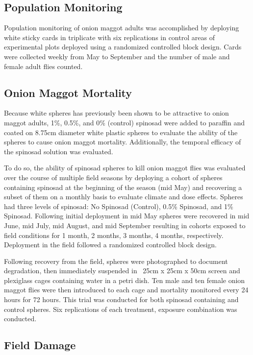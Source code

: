 \documentclass[alpha-refs]{wiley-article}
\begin{document}
\subsection{Population Monitoring}

Population monitoring of onion maggot adults was accomplished by deploying white sticky cards in triplicate with six replications in control areas of experimental plots deployed using a randomized controlled block design.  Cards were collected weekly from May to September and the number of male and female adult flies counted.  

\subsection{Onion Maggot Mortality}

Because white spheres has previously been shown to be attractive to onion maggot adults, 1\%, 0.5\%, and 0\% (control) spinosad were added to paraffin and coated on 8.75cm diameter white plastic spheres to evaluate the ability of the spheres to cause onion maggot mortality.  Additionally, the temporal efficacy of the spinosad solution was evaluated.  

To do so, the ability of spinosad spheres to kill onion maggot flies was evaluated over the course of multiple field seasons by deploying a cohort of spheres containing spinosad at the beginning of the season (mid May) and recovering a subset of them on a monthly basis to evaluate climate and dose effects.  Spheres had three levels of spinosad: No Spinosad (Control), 0.5\% Spinosad, and 1\% Spinosad.  Following initial deployment in mid May spheres were recovered in mid June, mid July, mid August, and mid September resulting in cohorts exposed to field conditions for 1 month, 2 months, 3 months, 4 months, respectively.  Deployment in the field followed a randomized controlled block design.

Following recovery from the field, spheres were photographed to document degradation, then immediately suspended in ~25cm x 25cm x 50cm screen and plexiglass cages containing water in a petri dish. Ten male and ten female onion maggot flies were then introduced to each cage and mortality monitored every 24 hours for 72 hours.  This trial was conducted for both spinosad  containing and control spheres.  Six replications of each treatment, exposure combination was conducted.  

\subsection{Field Damage}
\end{document}
